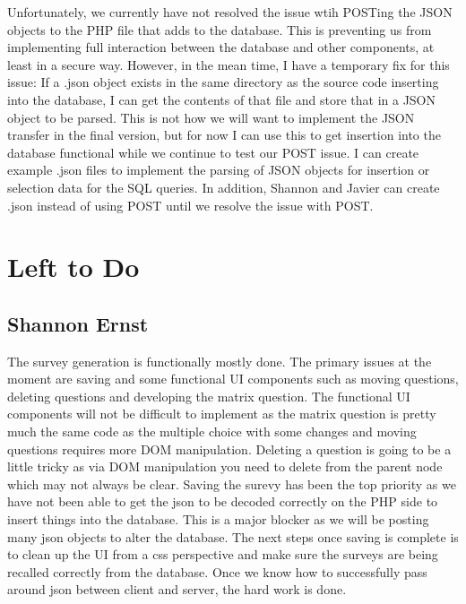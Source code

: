 \documentclass[letterpaper,10pt,serif, draftclsnofoot,onecolumn, compsoc, titlepage]{IEEEtran}
\begin{document}
Unfortunately, we currently have not resolved the issue wtih POSTing the JSON objects to the PHP file that adds to the database.
This is preventing us from implementing full interaction between the database and other components, at least in a secure way.
However, in the mean time, I have a temporary fix for this issue:
If a .json object exists in the same directory as the source code inserting into the database, I can get the contents of that file and store that in a JSON object to be parsed.
This is not how we will want to implement the JSON transfer in the final version, but for now I can use this to get insertion into the database functional while we continue to test our POST issue.
I can create example .json files to implement the parsing of JSON objects for insertion or selection data for the SQL queries.
In addition, Shannon and Javier can create .json instead of using POST until we resolve the issue with POST.

\section{Left to Do}

\subsection{Shannon Ernst}

The survey generation is functionally mostly done. The primary issues at the moment are saving and some functional UI components
such as moving questions, deleting questions and developing the matrix question. The functional UI components will not be difficult to implement as the matrix question is pretty much the same code as the multiple choice with some changes and moving questions requires more DOM manipulation. Deleting a question is going to be a little tricky as via DOM manipulation you need to delete from 
the parent node which may not always be clear. Saving the surevy has been the top priority as we have not been able to get the 
json to be decoded correctly on the PHP side to insert things into the database. This is a major blocker as we will be posting many 
json objects to alter the database. The next steps once saving is complete is to clean up the UI from a css perspective and make sure the surveys are being recalled 
correctly from the database. Once we know how to successfully pass around json between client and server, the hard work is done.
\end{document}
